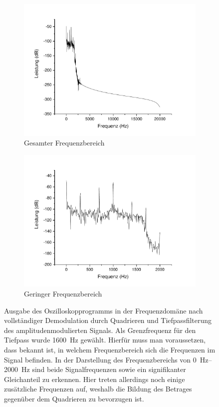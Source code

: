 \documentclass[
a4paper,
12pt,
pagesize,
ngerman
]{scrartcl}
\begin{document}
	\begin{figure}[H]
		\centering
		\begin{subfigure}[t]{0.495\textwidth}
			\centering
			\includegraphics[width=1\textwidth]{Origin-Files/AM-Demod-Quadrat-demod}
			\caption{Gesamter Frequenzbereich}
		\end{subfigure}
		\begin{subfigure}[t]{0.495\textwidth}
			\centering
			\includegraphics[width=1\textwidth]{Origin-Files/AM-Demod-Quadrat-demod-Bereich}
			\caption{Geringer Frequenzbereich}
			\label{fig_tag3_am_demod_quadrat_vollst}
		\end{subfigure}
	
		\caption{Ausgabe des Oszilloskopprogramms in der Frequenzdomäne nach vollständiger Demodulation durch Quadrieren und Tiefpassfilterung des amplitudenmodulierten Signals.
		Als Grenzfrequenz für den Tiefpass wurde \SI{1600}{\hertz} gewählt.
		Hierfür muss man voraussetzen, dass bekannt ist, in welchem Frequenzbereich sich die Frequenzen im Signal befinden.
		In der Darstellung des Frequenzbereichs von \SIrange{0}{2000}{\hertz} sind beide Signalfrequenzen sowie ein signifikanter Gleichanteil zu erkennen.
		Hier treten allerdings noch einige zusätzliche Frequenzen auf, weshalb die Bildung des Betrages gegenüber dem Quadrieren zu bevorzugen ist.
		}
		\centering
	\end{figure}
\end{document}
